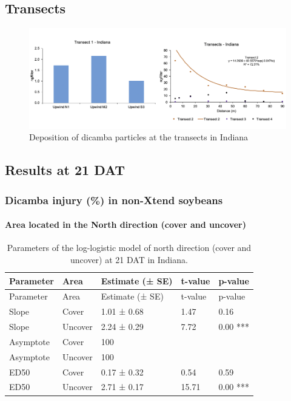 \documentclass[]{article}
\let\oldparagraph\paragraph
\renewcommand{\paragraph}[1]{\oldparagraph{#1}\mbox{}}
\begin{document}
\subsection{Transects}\label{transects-1}

\begin{figure}[h]

{\centering \includegraphics[width=1\linewidth]{INtransect} 

}

\caption{Deposition of dicamba particles at the transects in Indiana}\label{fig:unnamed-chunk-24}
\end{figure}

\pagebreak
\newpage

\subsection{Results at 21 DAT}\label{results-at-21-dat}

\subsubsection{Dicamba injury (\%) in non-Xtend
soybeans}\label{dicamba-injury-in-non-xtend-soybeans-2}

\paragraph{\texorpdfstring{Area located in the \textbf{North} direction
(cover and
uncover)}{Area located in the North direction (cover and uncover)}}\label{area-located-in-the-north-direction-cover-and-uncover}

\begin{longtable}[]{@{}lllll@{}}
\caption{Parameters of the log-logistic model of north direction (cover
and uncover) at 21 DAT in Indiana.}\tabularnewline
\toprule
Parameter & Area & Estimate (± SE) & t-value & p-value\tabularnewline
\midrule
\endfirsthead
\toprule
Parameter & Area & Estimate (± SE) & t-value & p-value\tabularnewline
\midrule
\endhead
Slope & Cover & 1.01 ± 0.68 & 1.47 & 0.16\tabularnewline
Slope & Uncover & 2.24 ± 0.29 & 7.72 & 0.00 ***\tabularnewline
Asymptote & Cover & 100 & &\tabularnewline
Asymptote & Uncover & 100 & &\tabularnewline
ED50 & Cover & 0.17 ± 0.32 & 0.54 & 0.59\tabularnewline
ED50 & Uncover & 2.71 ± 0.17 & 15.71 & 0.00 ***\tabularnewline
\bottomrule
\end{longtable}
\end{document}

